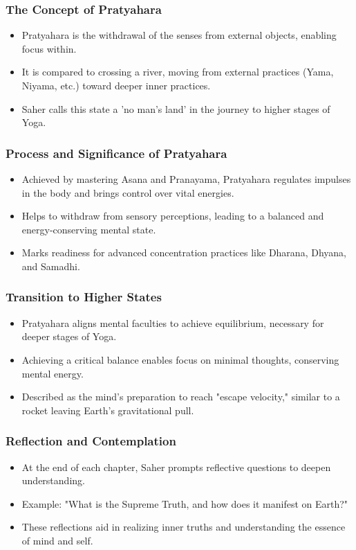 \begin{frame}[fragile]\frametitle{The Concept of Pratyahara}
    \begin{itemize}
        \item Pratyahara is the withdrawal of the senses from external objects, enabling focus within.
        \item It is compared to crossing a river, moving from external practices (Yama, Niyama, etc.) toward deeper inner practices.
        \item Saher calls this state a 'no man's land' in the journey to higher stages of Yoga.
    \end{itemize}
\end{frame}

\begin{frame}[fragile]\frametitle{Process and Significance of Pratyahara}
    \begin{itemize}
        \item Achieved by mastering Asana and Pranayama, Pratyahara regulates impulses in the body and brings control over vital energies.
        \item Helps to withdraw from sensory perceptions, leading to a balanced and energy-conserving mental state.
        \item Marks readiness for advanced concentration practices like Dharana, Dhyana, and Samadhi.
    \end{itemize}
\end{frame}

\begin{frame}[fragile]\frametitle{Transition to Higher States}
    \begin{itemize}
        \item Pratyahara aligns mental faculties to achieve equilibrium, necessary for deeper stages of Yoga.
        \item Achieving a critical balance enables focus on minimal thoughts, conserving mental energy.
        \item Described as the mind's preparation to reach "escape velocity," similar to a rocket leaving Earth's gravitational pull.
    \end{itemize}
\end{frame}

\begin{frame}[fragile]\frametitle{Reflection and Contemplation}
    \begin{itemize}
        \item At the end of each chapter, Saher prompts reflective questions to deepen understanding.
        \item Example: "What is the Supreme Truth, and how does it manifest on Earth?"
        \item These reflections aid in realizing inner truths and understanding the essence of mind and self.
    \end{itemize}
\end{frame}



